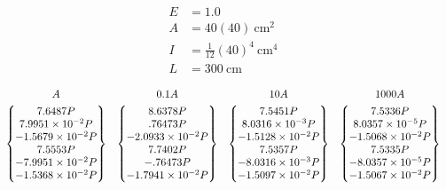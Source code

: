 \begin{minipage}{0.4\linewidth}
\begin{align*}
  E &= 1.0\\ A &= 40(40)\ \mathrm{cm^2}\\ I &= \tfrac{1}{12}(40)^4\ \mathrm{cm^4}\\ L &= 300\ \mathrm{cm}
\end{align*}
\end{minipage}
\begin{minipage}{0.5\linewidth}\centering
{}
\end{minipage}
{\small
\begin{equation*}
  \begin{array}{cccc}
    A & 0.1A & 10A & 1000A\\[4pt]
    \begin{Bmatrix}7.6487P\\ 7.9951\times10^{-2}P\\ -1.5679\times10^{-2}P\\ 7.5553P\\ -7.9951\times10^{-2}P\\ -1.5368\times10^{-2}P\end{Bmatrix} &
    \begin{Bmatrix}8.6378P\\ .76473P\\ -2.0933\times10^{-2}P\\ 7.7402P\\ -.76473P\\ -1.7941\times10^{-2}P\end{Bmatrix} &
    \begin{Bmatrix}7.5451P\\ 8.0316\times10^{-3}P\\ -1.5128\times10^{-2}P\\ 7.5357P\\ -8.0316\times10^{-3}P\\ -1.5097\times10^{-2}P\end{Bmatrix} &
    \begin{Bmatrix}7.5336P\\ 8.0357\times10^{-5}P\\ -1.5068\times10^{-2}P\\ 7.5335P\\ -8.0357\times10^{-5}P\\ -1.5067\times10^{-2}P\end{Bmatrix}
  \end{array}
\end{equation*}}

